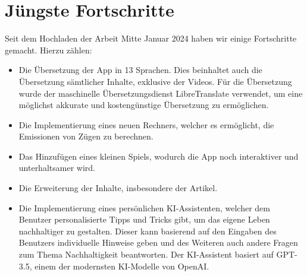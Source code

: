 \documentclass[../main.tex]{subfiles}
\begin{document}
    \chapter{Jüngste Fortschritte}
    Seit dem Hochladen der Arbeit Mitte Januar 2024 haben wir einige Fortschritte gemacht.
    Hierzu zählen:
    \begin{itemize}
        \item Die Übersetzung der App in 13 Sprachen.
        Dies beinhaltet auch die Übersetzung sämtlicher Inhalte, exklusive der Videos.
        Für die Übersetzung wurde der maschinelle Übersetzungsdienst LibreTranslate verwendet, um eine möglichst akkurate und kostengünstige Übersetzung zu ermöglichen.
        \item Die Implementierung eines neuen Rechners, welcher es ermöglicht, die Emissionen von Zügen zu berechnen.
        \item Das Hinzufügen eines kleinen Spiels, wodurch die App noch interaktiver und unterhaltsamer wird.
        \item Die Erweiterung der Inhalte, insbesondere der Artikel.
        \item Die Implementierung eines persönlichen KI-Assistenten, welcher dem Benutzer personalisierte Tipps und Tricks gibt, um das eigene Leben nachhaltiger zu gestalten.
        Dieser kann basierend auf den Eingaben des Benutzers individuelle Hinweise geben und des Weiteren auch andere Fragen zum Thema Nachhaltigkeit beantworten.
        Der KI-Assistent basiert auf GPT-3.5, einem der modernsten KI-Modelle von OpenAI.
    \end{itemize}
\end{document}
